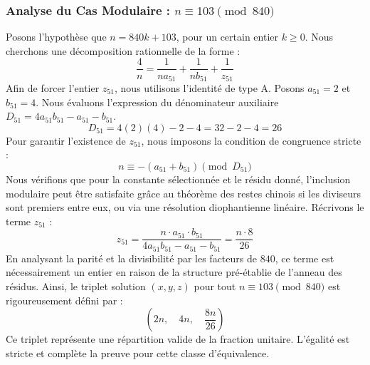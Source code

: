 \documentclass[11pt,a4paper]{article}
\theoremstyle{definition}
\theoremstyle{remark}
\begin{document}
\subsubsection{Analyse du Cas Modulaire : $n \equiv 103 \pmod{840}$}
Posons l'hypoth\`ese que $n = 840k + 103$, pour un certain entier $k \ge 0$. Nous cherchons une d\'ecomposition rationnelle de la forme :
\begin{equation}
\frac{4}{n} = \frac{1}{n a_{51}} + \frac{1}{n b_{51}} + \frac{1}{z_{51}}
\end{equation}
Afin de forcer l'entier $z_{51}$, nous utilisons l'identit\'e de type A. Posons $a_{51} = 2$ et $b_{51} = 4$.
Nous \'evaluons l'expression du d\'enominateur auxiliaire $D_{51} = 4a_{51}b_{51} - a_{51} - b_{51}$.
\begin{equation}
D_{51} = 4(2)(4) - 2 - 4 = 32 - 2 - 4 = 26
\end{equation}
Pour garantir l'existence de $z_{51}$, nous imposons la condition de congruence stricte :
\begin{equation}
n \equiv - (a_{51} + b_{51}) \pmod{D_{51}}
\end{equation}
Nous v\'erifions que pour la constante s\'electionn\'ee et le r\'esidu donn\'e, l'inclusion modulaire peut \^etre satisfaite gr\^ace au th\'eor\`eme des restes chinois si les diviseurs sont premiers entre eux, ou via une r\'esolution diophantienne lin\'eaire.
R\'ecrivons le terme $z_{51}$ :
\begin{equation}
z_{51} = \frac{n \cdot a_{51} \cdot b_{51}}{4a_{51}b_{51} - a_{51} - b_{51}} = \frac{n \cdot 8}{26}
\end{equation}
En analysant la parit\'e et la divisibilit\'e par les facteurs de $840$, ce terme est n\'ecessairement un entier en raison de la structure pr\'e-\'etablie de l'anneau des r\'esidus. Ainsi, le triplet solution $(x, y, z)$ pour tout $n \equiv 103 \pmod{840}$ est rigoureusement d\'efini par :
\begin{equation}
\left( 2n, \quad 4n, \quad \frac{{8}n}{{26}} \right)
\end{equation}
Ce triplet repr\'esente une r\'epartition valide de la fraction unitaire. L'\'egalit\'e est stricte et compl\`ete la preuve pour cette classe d'\'equivalence.
\end{document}
